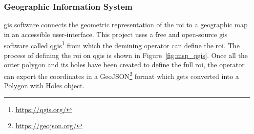 \subsubsection{Geographic Information System}

\gls{gis} software connects the geometric representation of the \gls{roi} to a geographic map in an accessible user-interface. This project uses a free and open-source \gls{gis} software called \gls{qgis}\footnote{\url{https://qgis.org/}} from which the demining operator can define the \gls{roi}. The process of defining the \gls{roi} on \gls{qgis} is shown in Figure~\ref{fig:msp_qgis}. Once all the outer polygon and its holes have been created to define the full \gls{roi}, the operator can export the coordinates in a GeoJSON\footnote{\url{https://geojson.org/}} format which gets converted into a Polygon with Holes object.


